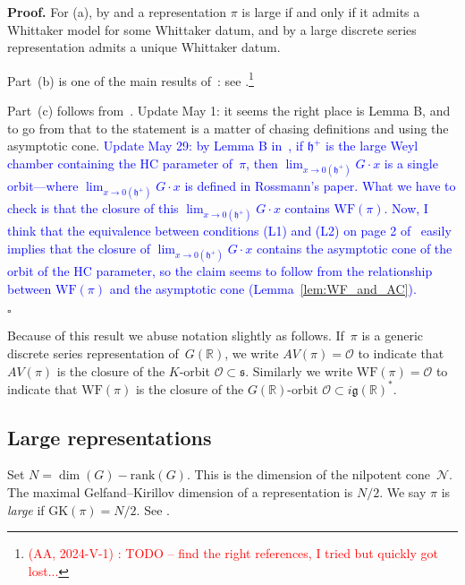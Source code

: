 \documentclass[10pt,leqno]{article}
\newcommand{\qed}{\hfill $\square$ \medskip}
\newenvironment{proof}[1][Proof]{\noindent\textbf{#1.} }{\qed}
\renewcommand{\O}{\mathcal O}
\newcommand{\R}{\mathbb R}
\newcommand{\N}{\mathcal N}
\newcommand{\g}{\mathfrak g}
\newcommand{\s}{\mathfrak s}
\newcommand{\WF}{\mathrm{WF}}
\newcommand{\GK}{\mathrm{GK}}
\begin{document}
\begin{proof} For (a), by \cite{vogan-gelfand-kirillov} and \cite{kostant_whittaker}
a representation $\pi$ is large if and only if it admits a Whittaker model for some Whittaker datum,
and by \cite[Lemma 14.14]{abv} a  large discrete series representation admits a unique Whittaker datum.

Part~(b) is one of the main results of~\cite{vogan_bowdoin}: see \cite[Theorem ?]{vogan_bowdoin}.\footnote{\textcolor{red}{(AA, 2024-V-1) : TODO -- find the right references, I tried but quickly got lost...}}


Part~(c) follows from~\cite{rossmann_limit_orbits}.  Update May 1: it seems the right place is Lemma B, and to go from that to the statement is a matter of chasing definitions and using the asymptotic cone. \textcolor{blue}{Update May 29: by Lemma B in~\cite{rossmann_limit_orbits}, if $\mathfrak{h}^+$ is the large Weyl chamber containing the HC parameter of~$\pi$, then $\lim_{x \to 0(\mathfrak{h}^+)} G\cdot x$ is a single orbit---where $\lim_{x \to 0(\mathfrak{h}^+)} G\cdot x$ is defined in Rossmann's paper. What we have to check is that the closure of this $\lim_{x \to 0(\mathfrak{h}^+)} G\cdot x$ contains $\WF(\pi)$. Now, I think that  the equivalence between conditions  (L1) and (L2) on page 2 of~\cite{rossmann_limit_orbits} easily implies that the closure of $\lim_{x \to 0(\mathfrak{h}^+)} G\cdot x$ contains the asymptotic cone of the orbit of the HC parameter, so the claim seems to follow from the relationship between $\WF(\pi)$ and the asymptotic cone (Lemma~\ref{lem:WF_and_AC}).}


\end{proof}

Because of this result we abuse notation slightly as follows. If~$\pi$ is a generic discrete series representation of~$G(\R)$, we write $AV(\pi)=\O$ to indicate that $AV(\pi)$ is the closure of the $K$-orbit $\O\subset \s$.
Similarly we write $\WF(\pi)=\O$ to indicate that $\WF(\pi)$ is the closure of the $G(\R)$-orbit $\O\subset i\g(\R)^*$.


\subsection{Large representations} Set $N=\dim(G)-\mathrm{rank}(G)$. This is the dimension of the nilpotent cone~$\N$. The maximal Gelfand--Kirillov dimension of a representation is $N/2$.
We say $\pi$ is {\it large} if $\GK(\pi)=N/2$. See \cite[Section~6]{vogan-gelfand-kirillov}. 
\end{document}

